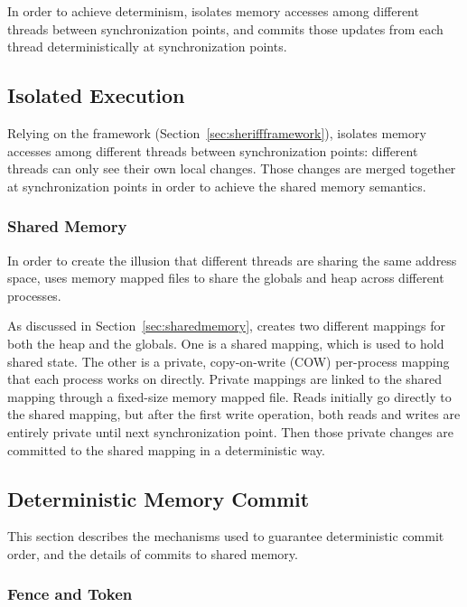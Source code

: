 In order to achieve determinism, \dthreads{} isolates memory accesses among different threads between synchronization points, and commits those updates from each thread deterministically at synchronization points. 

\subsection{Isolated Execution}

Relying on the \sheriff{} framework (Section~\ref{sec:sheriffframework}), \dthreads{} isolates memory accesses among different threads between synchronization points: different threads can only see their own local changes. Those changes are merged together at synchronization points in order to achieve the shared memory semantics. 

\subsubsection{Shared Memory}
\label{sec:stackandheap}

In order to create the illusion that different threads are sharing the same address space, \dthreads{} uses memory mapped files to share the globals and heap across different processes.

As discussed in Section~\ref{sec:sharedmemory}, \dthreads{} creates two different mappings for both the heap and the globals.  One is a shared mapping, which is used to hold shared state. The other is a private, copy-on-write (COW) per-process mapping that each process works on directly.  Private mappings are linked to the shared mapping through a fixed-size memory mapped file. Reads initially go directly to the shared mapping, but after the first write operation, both reads and writes are entirely private until next synchronization point. Then those private changes are committed to the shared mapping in a deterministic way. 

\subsection{Deterministic Memory Commit}
\label{sec:sharedmem}

This section describes the mechanisms used to guarantee deterministic commit order, and the details of commits to shared memory.

\subsubsection{Fence and Token}
\label{sec:schedule}

